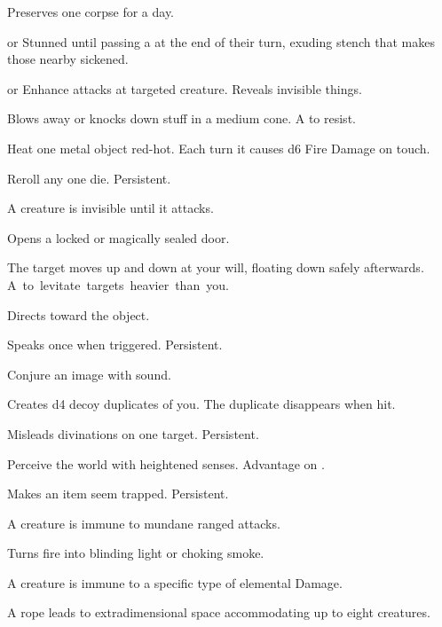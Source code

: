 \documentclass[itdr]{subfiles}
\begin{document}
\begin{enumerate}
	\item {} Preserves one corpse for a day.
	\item {}  or Stunned until passing a   at the end of their turn, exuding stench that makes those nearby sickened.
	\item {}  or Enhance attacks at targeted creature. Reveals invisible things.
	\item {} Blows away or knocks down stuff in a medium cone. A  to resist.
	\item {} Heat one metal object red-hot. Each turn it causes d6 Fire Damage on touch.
	\item {} Reroll any one die. Persistent.
	\begin{minipage}{\columnwidth}
	\item {} A creature is invisible until it attacks.
	\end{minipage}
	\break
	\item {} Opens a locked or magically sealed door.
	\item {} The target moves up and down at your will, floating down safely afterwards. \mbox{A  to levitate targets heavier than you.}
	\item {} Directs toward the object.
	\item {} Speaks once when triggered. Persistent.
	\item {} Conjure an image with sound.
	\item {} Creates d4 decoy duplicates of you. The duplicate disappears when hit.
	\item {} Misleads divinations on one \mbox{target}. Persistent.
	\item {} Perceive the world with heightened senses. Advantage on .
	\item {} Makes an item seem trapped. Persistent.
	\item {} A creature is immune to mundane ranged attacks.
	\item {} Turns fire into blinding light or choking smoke.
	\item {} A creature is immune to a specific type of elemental Damage.
	\item {} A rope leads to extradimensional space accommodating up to eight creatures.

\end{enumerate}
\end{document}
